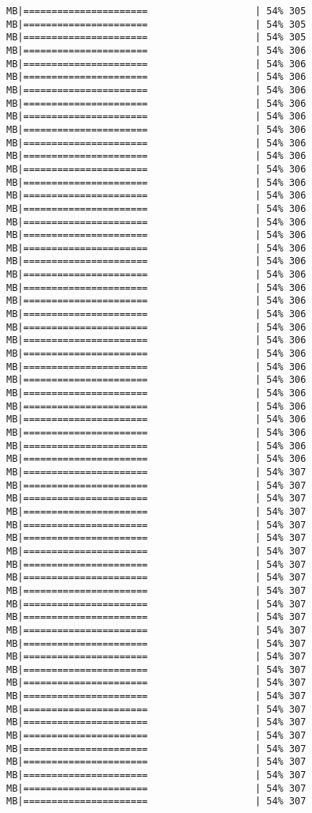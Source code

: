 \documentclass[
]{article}
\begin{document}
\begin{verbatim}
MB|======================                   | 54% 305 MB|======================                   | 54% 305 MB|======================                   | 54% 305 MB|======================                   | 54% 306 MB|======================                   | 54% 306 MB|======================                   | 54% 306 MB|======================                   | 54% 306 MB|======================                   | 54% 306 MB|======================                   | 54% 306 MB|======================                   | 54% 306 MB|======================                   | 54% 306 MB|======================                   | 54% 306 MB|======================                   | 54% 306 MB|======================                   | 54% 306 MB|======================                   | 54% 306 MB|======================                   | 54% 306 MB|======================                   | 54% 306 MB|======================                   | 54% 306 MB|======================                   | 54% 306 MB|======================                   | 54% 306 MB|======================                   | 54% 306 MB|======================                   | 54% 306 MB|======================                   | 54% 306 MB|======================                   | 54% 306 MB|======================                   | 54% 306 MB|======================                   | 54% 306 MB|======================                   | 54% 306 MB|======================                   | 54% 306 MB|======================                   | 54% 306 MB|======================                   | 54% 306 MB|======================                   | 54% 306 MB|======================                   | 54% 306 MB|======================                   | 54% 306 MB|======================                   | 54% 306 MB|======================                   | 54% 306 MB|======================                   | 54% 307 MB|======================                   | 54% 307 MB|======================                   | 54% 307 MB|======================                   | 54% 307 MB|======================                   | 54% 307 MB|======================                   | 54% 307 MB|======================                   | 54% 307 MB|======================                   | 54% 307 MB|======================                   | 54% 307 MB|======================                   | 54% 307 MB|======================                   | 54% 307 MB|======================                   | 54% 307 MB|======================                   | 54% 307 MB|======================                   | 54% 307 MB|======================                   | 54% 307 MB|======================                   | 54% 307 MB|======================                   | 54% 307 MB|======================                   | 54% 307 MB|======================                   | 54% 307 MB|======================                   | 54% 307 MB|======================                   | 54% 307 MB|======================                   | 54% 307 MB|======================                   | 54% 307 MB|======================                   | 54% 307 MB|======================                   | 54% 307 MB|======================                   | 54% 307 
\end{verbatim}
\end{document}
